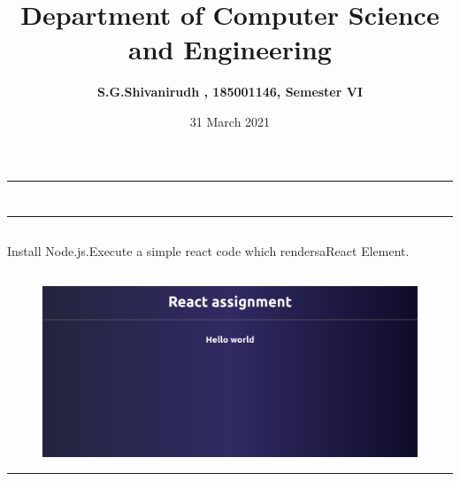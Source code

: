 \documentclass[12pt,letterpaper]{article}
\title{\textbf{Department of Computer Science and Engineering}}
\author{\textbf{S.G.Shivanirudh , 185001146, Semester VI }}
\date{31 March 2021}
\begin{document}
\maketitle
\hrule
\section*{}
\hrule 
\bigskip\bigskip

\subsection*{}

\subsection*{}
\begin{flushleft}
    Install Node.js.Execute a simple react code which rendersaReact Element.
\end{flushleft}

\subsection*{}
\subsubsection*{}
\begin{flushleft}

\end{flushleft}

\subsubsection*{}
\begin{flushleft}

\end{flushleft}

\newpage
\subsection*{}
\begin{figure}[h]
    \centering
    \includegraphics[width = \textwidth]{op.png}
\end{figure}

\hrule
\end{document}
